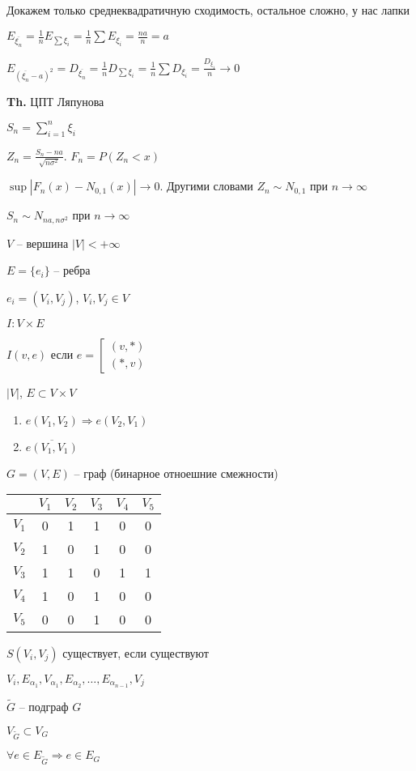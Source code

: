 \documentclass[14pt, letter paper]{article}
\begin{document}
Докажем только среднеквадратичную сходимость, остальное сложно, у нас лапки

$E_{\overline{\xi_n}} = \frac{1}{n} E_{\sum \xi_i} = \frac{1}{n} \sum E_{\xi_i} = \frac{na}{n} = a$

$E_{(\overline{\xi_n} - a)^2} = D_{\overline{\xi_n}} = \frac{1}{n} D_{\sum \xi_i} = \frac{1}{n} \sum D_{\xi_i} = \frac{D_{\xi_1}}{n} \rightarrow 0$

\vspace{5mm}

\textbf{Th.} ЦПТ Ляпунова

$S_n = \sum\limits_{i=1}^n \xi_i$

$Z_n = \frac{S_n - na}{\sqrt{n\sigma^2}}$. $F_n = P(Z_n < x)$

$\sup|F_n(x) - N_{0, 1}(x)| \rightarrow 0$. Другими словами $Z_n \sim N_{0, 1}$ при $n \rightarrow \infty$

$S_n \sim N_{na, n\sigma^2}$ при $n \rightarrow \infty$

\vspace{5mm}

$V$ -- вершина $|V| < +\infty$

$E = \{e_i\}$ -- ребра

$e_i = (V_i, V_j)$, $V_i, V_j \in V$

$I : V \times E$

$I(v, e)$ если $e = \left[ \begin{gathered}
    (v, *) \\
    (*, v)
\end{gathered} \right.$

$|V|$, $E \subset V \times V$

\begin{enumerate}
    \item $e(V_1, V_2) \Rightarrow e(V_2, V_1)$
    \item $\overline{e(V_1, V_1)}$
\end{enumerate}

$G = (V, E)$ -- граф (бинарное отноешние смежности)

\begin{center}
    \begin{tabular}{|c|c|c|c|c|c|}
    \hline
    & $V_1$ & $V_2$ & $V_3$ & $V_4$ & $V_5$ \\
    \hline
    $V_1$ & 0 & 1 & 1 & 0 & 0 \\
    \hline
    $V_2$ & 1 & 0 & 1 & 0 & 0 \\
    \hline
    $V_3$ & 1 & 1 & 0 & 1 & 1 \\
    \hline
    $V_4$ & 1 & 0 & 1 & 0 & 0 \\
    \hline
    $V_5$ & 0 & 0 & 1 & 0 & 0 \\
    \hline
    \end{tabular}
\end{center}

$S(V_i, V_j)$ существует, если существуют

$V_i, E_{\alpha_1}, V_{\alpha_1}, E_{\alpha_2}, \ldots, E_{\alpha_{n-1}}, V_j$

$\tilde{G}$ -- подграф $G$

$V_{\tilde{G}} \subset V_{G}$

$\forall e \in E_{\tilde{G}} \Rightarrow e \in E_G$
\end{document}
